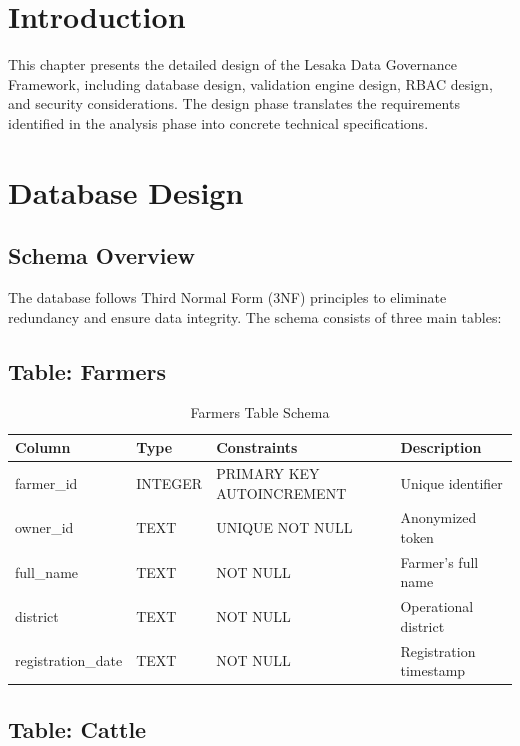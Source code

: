 
\section{Introduction}

This chapter presents the detailed design of the Lesaka Data Governance Framework, including database design, validation engine design, RBAC design, and security considerations. The design phase translates the requirements identified in the analysis phase into concrete technical specifications.

\section{Database Design}

\subsection{Schema Overview}

The database follows Third Normal Form (3NF) principles to eliminate redundancy and ensure data integrity. The schema consists of three main tables:

\subsection{Table: Farmers}

\begin{table}[H]
\centering
\begin{tabular}{|l|l|l|l|}
\hline
\textbf{Column} & \textbf{Type} & \textbf{Constraints} & \textbf{Description} \\
\hline
farmer\_id & INTEGER & PRIMARY KEY AUTOINCREMENT & Unique identifier \\
owner\_id & TEXT & UNIQUE NOT NULL & Anonymized token \\
full\_name & TEXT & NOT NULL & Farmer's full name \\
district & TEXT & NOT NULL & Operational district \\
registration\_date & TEXT & NOT NULL & Registration timestamp \\
\hline
\end{tabular}
\caption{Farmers Table Schema}
\end{table}

\subsection{Table: Cattle}

